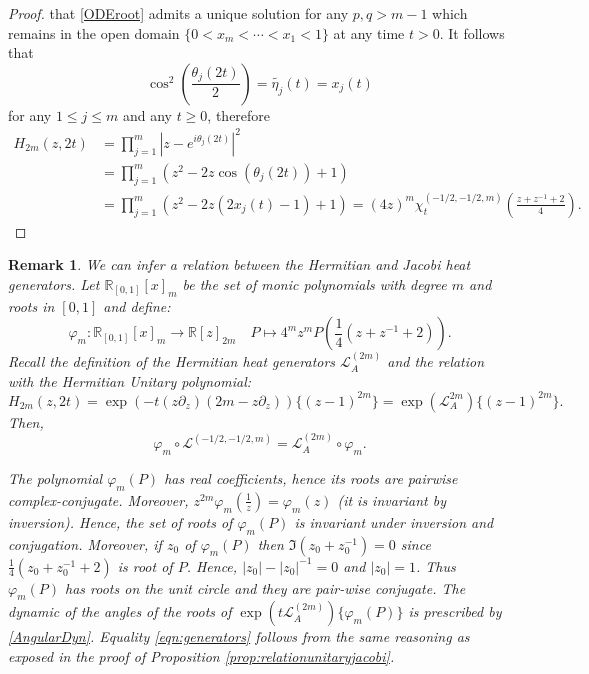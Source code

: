 \documentclass[12pt,reqno]{amsart}
\newtheorem{remark}{Remark}
\begin{document}
\begin{proof}
that \eqref{ODEroot} admits a unique solution for any $p,q > m-1$ which remains in the open domain $\{0 < x_m < \cdots < x_1 < 1\}$ at any time $t > 0$. It follows that 
\begin{equation*}
\cos^2\left(\frac{\theta_j(2t)}{2}\right) = \tilde{\eta_j}(t) = x_j(t)    
\end{equation*}
for any $1 \leq j \leq m$ and any $t \geq 0$, therefore 
\begin{align*}
H_{2m}(z,2t) & = \prod_{j=1}^m|z-e^{i\theta_j(2t)}|^2 
\\& = \prod_{j=1}^m(z^2-2z \cos(\theta_j(2t)) + 1)
\\& = \prod_{j=1}^m(z^2-2z (2x_j(t) - 1)+1) = (4z)^m \chi^{(-1/2,-1/2,m)}_t\left(\frac{z+z^{-1}+2}{4}\right).
\end{align*}
\end{proof} 
\begin{remark}
    We can infer a relation between the Hermitian and Jacobi heat generators. Let 
    $\mathbb{R}_{[0,1]}[x]_m$ be the set of monic polynomials with degree $m$ and roots in $[0,1]$ and define:
    $$
\varphi_{m}\colon \mathbb{R}_{[0,1]}[x]_m \to \mathbb{R}[z]_{2m}\quad P \mapsto 4^mz^mP(\frac{1}{4}(z+z^{-1}+2)).
    $$
    Recall the definition of the Hermitian heat generators $\mathcal{L}^{(2m)}_{A}$ and the relation with the Hermitian Unitary polynomial:
    $$
H_{2m}(z,2t)=\exp(-t(z\partial_z){(2m-z\partial_z)})\{(z-1)^{2m}\} = \exp(\mathcal{L}_{A}^{2m})\{(z-1)^{2m} \}.
$$
Then,
    \begin{equation}
    \label{eqn:generators}
    \varphi_m\circ \mathcal{L}^{(-1/2,-1/2,m)} = \mathcal{L}_{A}^{(2m)} \circ \varphi_m.
    \end{equation}

The polynomial $
\varphi_m(P)
$
has real coefficients, hence its roots are pairwise complex-conjugate. Moreover, $z^{2m}\varphi_m(\frac{1}{z})=\varphi_m(z)$ (it is invariant by inversion). Hence, the set of roots of $
\varphi_m(P)
$ is invariant under inversion and conjugation. Moreover, if $z_0$ of $\varphi_m(P)$
then $ \Im(z_0 + z_0^{-1}) = 0$ since $\frac{1}{4}(z_0 + z_0^{-1}+2)$ is root of $P$. Hence, $|z_0| -|z_0|^{-1} = 0$ and $|z_0| = 1$. Thus $\varphi_m(P)$ has roots on the unit circle and they are pair-wise conjugate.
The dynamic of the angles of the roots of $\exp(t\mathcal{L}_{A}^{(2m)})\{\varphi_m(P)\}$ is prescribed by \eqref{AngularDyn}. Equality \eqref{eqn:generators} follows from the same reasoning as exposed in the proof of Proposition \ref{prop:relationunitaryjacobi}.

\end{remark}
\end{document}
